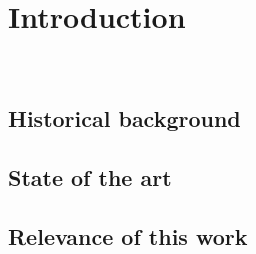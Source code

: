 \chapter{Introduction}\label{chap:intro}
\minitoc\
\section{Historical background}
\section{State of the art}
\section{Relevance of this work}
 
